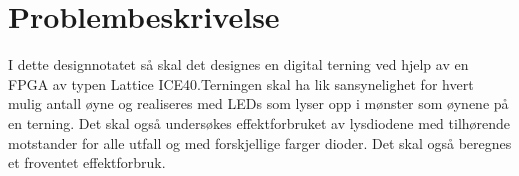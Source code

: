 \section{Problembeskrivelse}
\label{problemBeskrivelse}



I dette designnotatet så skal det designes en digital terning ved hjelp av en FPGA av typen Lattice ICE40.Terningen skal ha lik sansynelighet for hvert mulig antall øyne og realiseres med LEDs som lyser opp i mønster som øynene på en terning. Det skal også undersøkes effektforbruket av lysdiodene med tilhørende motstander for alle utfall og med forskjellige farger dioder. Det skal også beregnes et froventet effektforbruk.